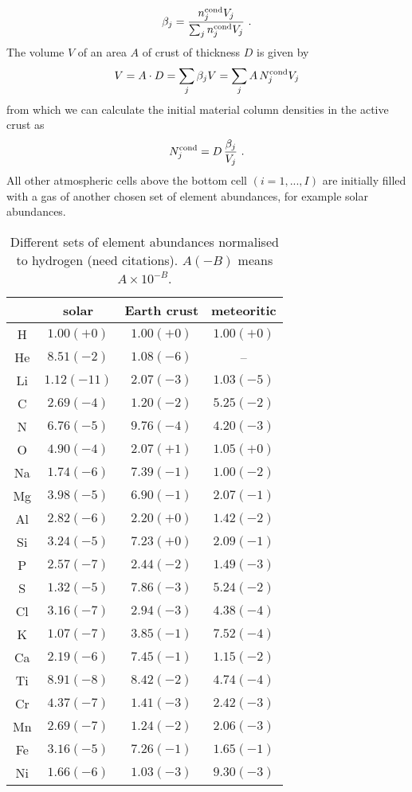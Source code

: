 \documentclass[11pt]{article}
\begin{document}
\begin{equation}
  \beta_j = \frac{n_j^{\rm cond} V_j}{\sum_j n_j^{\rm cond} V_j} \ .
\end{equation}
The volume $V$ of an area $A$ of crust of thickness $D$ is given by 
\begin{equation}
  V = A\cdot D = \sum_j \beta_j V = \sum_j A\,N_j^{\rm cond} V_j
\end{equation}
from which we can calculate the initial material column densities in
the active crust as
\begin{equation}
  N_j^{\rm cond} = D\,\frac{\beta_j}{V_j} \ .
\end{equation}
All other atmospheric cells above the bottom cell $(i=1,...,I)$ are
initially filled with a gas of another chosen set of element
abundances, for example solar abundances.

\begin{table}
\centering
\caption{Different sets of element abundances normalised to hydrogen
  (need citations). $A(-B)$ means $A\times 10^{-B}$.}
\label{tab:eps}
\vspace*{2mm}
\begin{tabular}{cccc}
\hline
     &     solar & Earth crust & meteoritic \\
\hline
 H   & $1.00(+0)$ &   $1.00(+0)$ &   $1.00(+0)$ \\
 He  & $8.51(-2)$ &   $1.08(-6)$ &   -- \\
 Li  & $1.12(-11)$ &  $2.07(-3)$ &   $1.03(-5)$ \\
 C   & $2.69(-4)$ &   $1.20(-2)$ &   $5.25(-2)$ \\
 N   & $6.76(-5)$ &   $9.76(-4)$ &   $4.20(-3)$ \\
 O   & $4.90(-4)$ &   $2.07(+1)$ &   $1.05(+0)$ \\
 Na  & $1.74(-6)$ &   $7.39(-1)$ &   $1.00(-2)$ \\
 Mg  & $3.98(-5)$ &   $6.90(-1)$ &   $2.07(-1)$ \\
 Al  & $2.82(-6)$ &   $2.20(+0)$ &   $1.42(-2)$ \\
 Si  & $3.24(-5)$ &   $7.23(+0)$ &   $2.09(-1)$ \\
 P   & $2.57(-7)$ &   $2.44(-2)$ &   $1.49(-3)$ \\
 S   & $1.32(-5)$ &   $7.86(-3)$ &   $5.24(-2)$ \\
 Cl  & $3.16(-7)$ &   $2.94(-3)$ &   $4.38(-4)$ \\
 K   & $1.07(-7)$ &   $3.85(-1)$ &   $7.52(-4)$ \\
 Ca  & $2.19(-6)$ &   $7.45(-1)$ &   $1.15(-2)$ \\
 Ti  & $8.91(-8)$ &   $8.42(-2)$ &   $4.74(-4)$ \\
 Cr  & $4.37(-7)$ &   $1.41(-3)$ &   $2.42(-3)$ \\
 Mn  & $2.69(-7)$ &   $1.24(-2)$ &   $2.06(-3)$ \\
 Fe  & $3.16(-5)$ &   $7.26(-1)$ &   $1.65(-1)$ \\
 Ni  & $1.66(-6)$ &   $1.03(-3)$ &   $9.30(-3)$ \\
\hline
\end{tabular}
\end{table}
\end{document}
